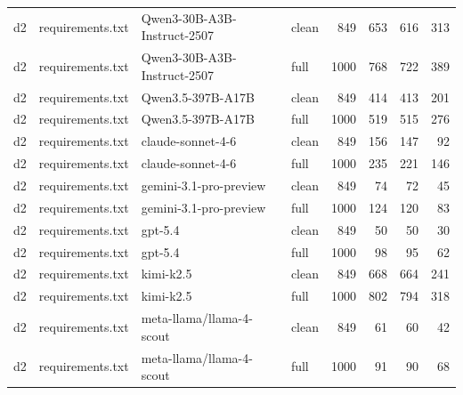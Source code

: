 \begin{tabular}{llllrrrr}
d2 & requirements.txt & Qwen3-30B-A3B-Instruct-2507 & clean & 849 & 653 & 616 & 313 \\
d2 & requirements.txt & Qwen3-30B-A3B-Instruct-2507 & full & 1000 & 768 & 722 & 389 \\
d2 & requirements.txt & Qwen3.5-397B-A17B & clean & 849 & 414 & 413 & 201 \\
d2 & requirements.txt & Qwen3.5-397B-A17B & full & 1000 & 519 & 515 & 276 \\
d2 & requirements.txt & claude-sonnet-4-6 & clean & 849 & 156 & 147 & 92 \\
d2 & requirements.txt & claude-sonnet-4-6 & full & 1000 & 235 & 221 & 146 \\
d2 & requirements.txt & gemini-3.1-pro-preview & clean & 849 & 74 & 72 & 45 \\
d2 & requirements.txt & gemini-3.1-pro-preview & full & 1000 & 124 & 120 & 83 \\
d2 & requirements.txt & gpt-5.4 & clean & 849 & 50 & 50 & 30 \\
d2 & requirements.txt & gpt-5.4 & full & 1000 & 98 & 95 & 62 \\
d2 & requirements.txt & kimi-k2.5 & clean & 849 & 668 & 664 & 241 \\
d2 & requirements.txt & kimi-k2.5 & full & 1000 & 802 & 794 & 318 \\
d2 & requirements.txt & meta-llama/llama-4-scout & clean & 849 & 61 & 60 & 42 \\
d2 & requirements.txt & meta-llama/llama-4-scout & full & 1000 & 91 & 90 & 68 \\
\bottomrule
\end{tabular}
